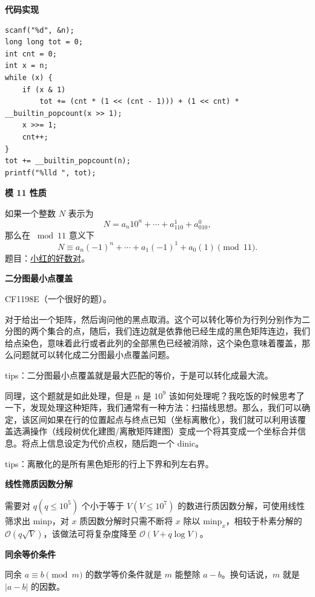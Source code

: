 \par\medskip\noindent\textbf{代码实现}\par\smallskip
\begin{verbatim}
scanf("%d", &n);
long long tot = 0;
int cnt = 0;
int x = n;
while (x) {
    if (x & 1)
        tot += (cnt * (1 << (cnt - 1))) + (1 << cnt) * __builtin_popcount(x >> 1);
    x >>= 1;
    cnt++;
}
tot += __builtin_popcount(n);
printf("%lld ", tot);
\end{verbatim}

\par\medskip\noindent\textbf{模 11 性质}\par\smallskip
如果一个整数 $N$ 表示为
\[
N = a_n10^n + \cdots + a_110^1 + a_010^0,
\]
那么在 $\bmod 11$ 意义下
\[
N \equiv a_n(-1)^n + \cdots + a_1(-1)^1 + a_0(1) \pmod{11}.
\]
题目：\href{https://ac.nowcoder.com/acm/contest/117763/D}{小红的好数对}。

\par\medskip\noindent\textbf{二分图最小点覆盖}\par\smallskip
CF1198E（一个很好的题）。

对于给出一个矩阵，然后询问他的黑点取消。这个可以转化等价为行列分别作为二分图的两个集合的点，随后，我们连边就是依靠他已经生成的黑色矩阵连边，我们给点染色，意味着此行或者此列的全部黑色已经被消除，这个染色意味着覆盖，那么问题就可以转化成二分图最小点覆盖问题。

tips：二分图最小点覆盖就是最大匹配的等价，于是可以转化成最大流。

同理，这个题就是如此处理，但是 $n$ 是 $10^9$ 该如何处理呢？我吃饭的时候思考了一下，发现处理这种矩阵，我们通常有一种方法：扫描线思想。那么，我们可以确定，该区间如果在行的位置起点与终点已知（坐标离散化），我们就可以利用该覆盖选满操作（线段树优化建图/离散矩阵建图）变成一个将其变成一个坐标合并信息。将点上信息设定为代价点权，随后跑一个 dinic。

tips：离散化的是所有黑色矩形的行上下界和列左右界。

\par\medskip\noindent\textbf{线性筛质因数分解}\par\smallskip
需要对 $q(q\le 10^5)$ 个小于等于 $V(V\le 10^7)$ 的数进行质因数分解，可使用线性筛求出 $\mathrm{minp}$，对 $x$ 质因数分解时只需不断将 $x$ 除以 $\mathrm{minp}_x$，相较于朴素分解的 $\mathcal{O}(q\sqrt{V})$，该做法可将复杂度降至 $\mathcal{O}(V+q\log V)$。

\par\medskip\noindent\textbf{同余等价条件}\par\smallskip
同余 $a\equiv b\pmod m$ 的数学等价条件就是 $m$ 能整除 $a-b$。换句话说，$m$ 就是 $|a-b|$ 的因数。

